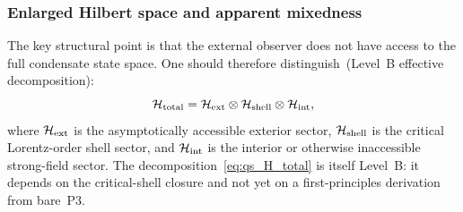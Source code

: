 \subsubsection*{Enlarged Hilbert space and apparent mixedness}

The key structural point is that the external observer does not have
access to the full condensate state space.
One should therefore distinguish~(Level~B effective decomposition):
\begin{equation}
  \label{eq:qs_H_total}
  \mathcal{H}_{\rm total}
  =
  \mathcal{H}_{\rm ext}
  \otimes
  \mathcal{H}_{\rm shell}
  \otimes
  \mathcal{H}_{\rm int},
\end{equation}
where $\mathcal{H}_{\rm ext}$ is the asymptotically accessible exterior
sector, $\mathcal{H}_{\rm shell}$ is the critical Lorentz-order shell
sector, and $\mathcal{H}_{\rm int}$ is the interior or otherwise
inaccessible strong-field sector.
The decomposition~\eqref{eq:qs_H_total} is itself Level~B: it
depends on the critical-shell closure and not yet on a first-principles
derivation from bare~P3.

